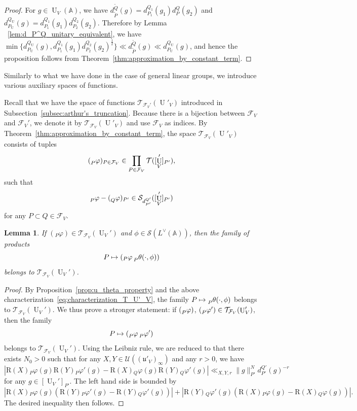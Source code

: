 \documentclass[letterpaper,11pt]{amsart}
\newcommand{\fu}{\mathfrak{u}}
\newcommand{\bA}{\mathbb{A}}
\newcommand{\cF}{\mathcal{F}}
\newcommand{\cS}{\mathcal{S}}
\newcommand{\cT}{\mathcal{T}}
\newcommand{\cU}{\mathcal{U}}
\newcommand{\<}{\negthickspace}
\DeclareMathOperator{\U}{U}
\theoremstyle{definition}
\theoremstyle{plain}
\newtheorem{lemma}[definition]{Lemma}
\theoremstyle{remark}
\numberwithin{equation}{section}
\begin{document}
\begin{proof}
For $g \in \U_V(\bA)$, we have $ d_{\widetilde{P}}^{\widetilde{Q}}(g) = d_{P_1}^{Q_1}(g_1)d_P^Q(g_2)$ and $d_{P_{\U}}^{Q_{\U}}(g) =   d_{P_1}^{Q_1}(g_1)d_{P_2}^{Q_2}(g_2)$.
Therefore by Lemma ~\ref{lem:d_P^Q_unitary_equivalent}, we have $\min\{ d_{P_{\U}}^{Q_{\U}}(g),d_{P_1}^{Q_1}(g_1)d_{P_2}^{Q_2}(g_2)^{\frac 12} \} \ll
    d_{\widetilde{P}}^{\widetilde{Q}}(g) \ll d_{P_{\U}}^{Q_{\U}}(g)$,
and hence the proposition follows from Theorem~\ref{thm:approximation_by_constant_term}.
\end{proof}


Similarly to what we have done in the case of general linear groups, we introduce
various auxiliary spaces of functions.

Recall that we have the space of functions $\cT_{\cF_V'}(\U'_V)$ introduced in
Subsection~\ref{subsec:arthur's_truncation}. Because there is a bijection between
$\cF_V$ and $\cF_V'$, we denote it by $\cT_{\cF_V}(\U'_V)$ and use $\cF_{V}$
as indices. By Theorem~\ref{thm:approximation_by_constant_term}, the
space $\cT_{\cF_V}(\U'_V)$ consists of tuples
    \[
    (\prescript{}{P}{\varphi})_{P \in \cF_V} \in
    \prod_{P \in \cF_V} \cT([\U_V']_{P'}),
    \]
such that
    \begin{equation}    \label{eq:characterization_T_U'_V}
    \prescript{}{P}{\varphi} - (\prescript{}{Q}{\varphi})_{P'}
    \in \cS_{d_{P'}^{Q'}}([\U_V']_{P'})
    \end{equation}
for any $P \subset Q \in \cF_V$.

\begin{lemma}   \label{lemma:multiplication_by_theta}
If $({}_P \varphi) \in \cT_{\cF_V}(\U_V')$ and $\phi \in \cS(L^\vee(\bA))$,
then the family of products
    \[
    P \mapsto ({}_P \varphi  \prescript{}{P}{\theta(\cdot, \phi)})
    \]
belongs to $\cT_{\cF_V}(\U_V')$.
\end{lemma}

\begin{proof}
By Proposition~\ref{prop:u_theta_property} and the above
characterization~\eqref{eq:characterization_T_U'_V}, the family $P \mapsto
\prescript{}{P}{\theta(\cdot, \phi)}$ belongs to $\cT_{\cF_V}(\U_V')$. We thus
prove a stronger statement: if $(\prescript{}{P}{\varphi})$,  $(\prescript{}{P}{\varphi'}) \in \cT_{\cF_V}(\U_V')$, then the family
    \[
    P \mapsto (\prescript{}{P}{\varphi} \prescript{}{P}{\varphi'})
    \]
belongs to $\cT_{\cF_V}(\U_V')$. Using the Leibniz rule, we are reduced to
that there exists $N_0>0$ such that for any $X,Y \in \cU((\fu'_V)_\infty)$
and any $r>0$, we have
    \[
    \left| \mathrm{R}(X) {}_P \varphi(g) \mathrm{R}(Y) {}_P \varphi'(g)
    -  \mathrm{R}(X) {}_Q \varphi(g) \mathrm{R}(Y) {}_Q \varphi'(g) \right|
    \ll_{X,Y,r} \|g\|_{P'}^{N} d_{P'}^{Q'}(g)^{-r}
    \]
for any $g \in [\U_V']_{P'}$. The left hand side is bounded by
    \[
     \left| \mathrm{R}(X) {}_P \varphi(g)
     \left(\mathrm{R}(Y) {}_P \varphi'(g)
     - \mathrm{R}(Y) {}_Q \varphi'(g) \right) \right|
     + \left| \mathrm{R}(Y) {}_Q \varphi'(g)
     \left( \mathrm{R}(X) {}_P \varphi(g)
     - \mathrm{R}(X) {}_Q \varphi(g) \right) \right|.
    \]
The desired inequality then follows.
\end{proof}
\end{document}
